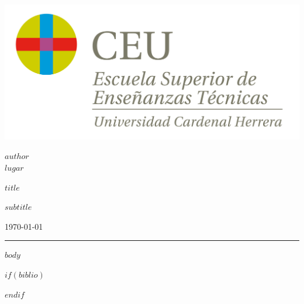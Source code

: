 \documentclass[$fontsize$,a4paper,twoside,onecolumn]{scrartcl}
\subtitle{$subtitle$}
\date{$date$}
\newcommand{\mititulo}{ $title$ }
\newcommand{\misubtitulo}{ $subtitle$ }
\newcommand{\ELautor}{$author$}
\newcommand{\dedonde}{$lugar$}
\begin{document}
	
\begin{minipage}[c]{0.29\textwidth}
	\includegraphics[width=\linewidth]{00_fac_eset.png}
\end{minipage}
\begin{minipage}[r]{0.7\textwidth}
	\begin{flushright}
		\large
		\ELautor \\
		\dedonde \\[0.1cm]
	\end{flushright}
	
\end{minipage}

\begin{flushright}
	\Huge 
	
	\mititulo \\[0.4cm]
	
	\Large
	
	\misubtitulo \\[0.5cm]
	
\end{flushright}
\today\\
\hrule
\renewcommand{\tablename}{Tabla}
\renewcommand{\contentsname}{Contenidos}




$body$

$if(biblio)$
	
	
$endif$
\end{document}
